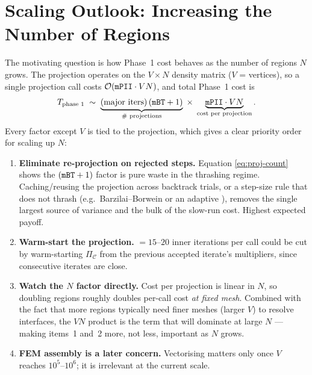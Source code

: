 \documentclass[11pt,a4paper]{article}
\begin{document}
\section{Scaling Outlook: Increasing the Number of Regions}
\label{sec:scaling}

The motivating question is how Phase~1 cost behaves as the number of
regions $N$ grows.  The projection operates on the $V\times N$ density
matrix ($V$ = vertices), so a single projection call costs
$\mathcal{O}(\texttt{mPII}\cdot V N)$, and total Phase~1 cost is
\begin{equation}
  T_{\text{phase 1}}
  \;\sim\;
  \underbrace{(\text{major iters})\,(\texttt{mBT}+1)}_{\text{\# projections}}
  \;\times\;
  \underbrace{\texttt{mPII}\cdot V N}_{\text{cost per projection}}.
  \label{eq:scaling}
\end{equation}
Every factor except $V$ is tied to the projection, which gives a clear
priority order for scaling up $N$:

\begin{enumerate}[noitemsep]
  \item \textbf{Eliminate re-projection on rejected steps.}  Equation
        \eqref{eq:proj-count} shows the $(\texttt{mBT}+1)$ factor is pure
        waste in the thrashing regime.  Caching/reusing the projection
        across backtrack trials, or a step-size rule that does not thrash
        (e.g.\ Barzilai--Borwein or an adaptive ), removes the
        single largest source of variance and the bulk of the slow-run
        cost.  Highest expected payoff.
  \item \textbf{Warm-start the projection.}  $=15$--$20$ inner
        iterations per call could be cut by warm-starting
        $\Pi_{\mathcal{C}}$ from the previous accepted iterate's
        multipliers, since consecutive iterates are close.
  \item \textbf{Watch the $N$ factor directly.}  Cost per projection is
        linear in $N$, so doubling regions roughly doubles per-call cost
        \emph{at fixed mesh}.  Combined with the fact that more regions
        typically need finer meshes (larger $V$) to resolve interfaces,
        the $VN$ product is the term that will dominate at large $N$ ---
        making items~1 and~2 more, not less, important as $N$ grows.
  \item \textbf{FEM assembly is a later concern.}  Vectorising
         matters only once $V$ reaches
        $10^5$--$10^6$; it is irrelevant at the current scale.
\end{enumerate}
\end{document}
